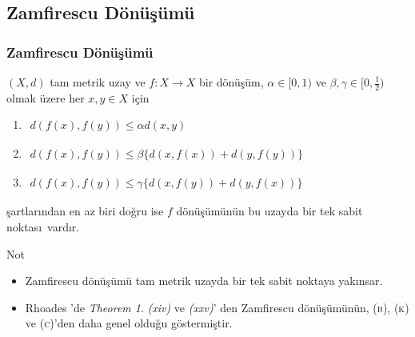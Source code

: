 \documentclass[8pt]{beamer}
\begin{document}
\subsection{Zamfirescu D\"{o}n\"{u}\c{s}\"{u}m\"{u}}
\begin{frame}
\frametitle{Zamfirescu D\"{o}n\"{u}\c{s}\"{u}m\"{u}}
 $(X,d)$  tam metrik uzay ve $f: X \rightarrow X$ bir d\"{o}n\"{u}\c{s}\"{u}m, $\alpha \in [0,1)$ ve $\beta , \gamma \in [0,\frac{1}{2}) $ olmak \"{u}zere her $x,y \in X$ i\c{c}in 
    \begin{enumerate}
    \item $\begin{aligned} d(f(x), f(y))\leq \alpha d(x,y)
      \end{aligned}$
    \item
      $\begin{aligned} d(f(x), f(y))\leq \beta \big\{
        d(x,f(x))+d(y,f(y))\big\}
      \end{aligned}$

    \item
      $\begin{aligned} d(f(x), f(y))\leq \gamma \big\{
        d(x,f(y))+d(y,f(x))\big\}
      \end{aligned}$
\end{enumerate}
\c{s}artlar\i ndan en az biri do\u{g}ru ise $f$ d\"{o}n\"{u}\c{s}\"{u}m\"{u}n\"{u}n bu uzayda bir tek sabit noktas\i \ vard\i r.
\begin{block}{Not}  
\begin{itemize}[<+-| alert@+>]  
\item Zamfirescu d\"{o}n\"{u}\c{s}\"{u}m\"{u} \cite{Zamfirescu1974} tam metrik uzayda bir tek sabit noktaya yak\i nsar.  
\item Rhoades \cite{Rhoades1977} 'de \emph{Theorem 1}. \emph{(xiv)} ve \emph{(xxv)}' den   Zamfirescu d\"{o}n\"{u}\c{s}\"{u}m\"{u}n\"{u}n, \textsc{(b)}, \textsc{(k)} ve \textsc{(c)}'den daha genel oldu\u{g}u g\"ostermi\c{s}tir.
\end{itemize}

\end{block}
\end{frame}%
\end{document}
